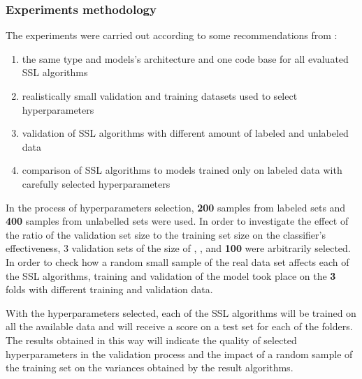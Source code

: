 \documentclass[12pt]{article}
\theoremstyle{definition}
\DeclareRobustCommand{\[}{\begin{equation}}
\DeclareRobustCommand{\]}{\end{equation}}
\begin{document}
\subsubsection{Experiments methodology}
\par The experiments were carried out according to some recommendations from \cite{Realistic}:
\begin{enumerate}
    \item the same type and models's architecture and one code base for all evaluated SSL algorithms 
    \item realistically small validation and training datasets used to select hyperparameters
    \item validation of SSL algorithms with different amount of labeled and unlabeled data
    \item comparison of SSL algorithms to models trained only on labeled data with carefully selected hyperparameters
\end{enumerate}
\par
In the process of hyperparameters selection, \textbf{200} samples from labeled sets and \textbf{400} samples from unlabelled sets were used.
In order to investigate the effect of the ratio of the validation set size to the training set size on the classifier's effectiveness, 3 validation sets of the size of , , and \textbf{100} were arbitrarily selected. 
In order to check how a random small sample of the real data set  affects each of the SSL algorithms, training and validation of the model took  place on the \textbf{3} folds with different training and validation data. \par

With the hyperparameters selected, each of the SSL algorithms will be trained on all the available data and will receive a score on a test set for each of the folders. The results obtained in this way will indicate the quality of selected hyperparameters in the validation process and the impact of a random sample of the training set on the variances obtained by the result algorithms.
\end{document}
